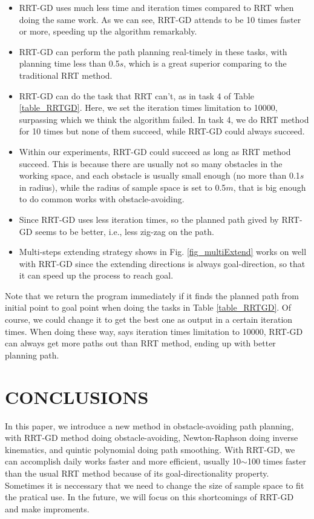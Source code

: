\documentclass[letterpaper, 10 pt, conference]{ieeeconf}  %
\begin{document}
\begin{itemize}

\item RRT-GD uses much less time and iteration times compared to RRT when doing the same work. As we can see, RRT-GD attends to be 10 times faster or more, speeding up the algorithm remarkably.
\item RRT-GD can perform the path planning real-timely in these tasks, with planning time less than 0.5$s$, which is a great superior comparing to the traditional RRT method.
\item RRT-GD can do the task that RRT can't, as in task 4 of Table \ref{table_RRTGD}. Here, we set the iteration times limitation to 10000,  surpassing which we think the algorithm failed. In task 4, we do RRT method for 10 times but none of them succeed, while RRT-GD could always succeed.
\item Within our experiments, RRT-GD could succeed as long as RRT method succeed. This is because there are usually not so many obstacles in the working space, and each obstacle is usually small enough (no more than 0.1$s$ in radius), while the radius of sample space is set to 0.5$m$, that is big enough to do common works with obstacle-avoiding.
\item Since RRT-GD uses less iteration times, so the planned path gived by RRT-GD seems to be better, i.e., less zig-zag on the path.
\item Multi-steps extending strategy shows in Fig. \ref{fig_multiExtend} works on well with RRT-GD since the extending directions is always goal-direction, so that it can speed up the process to reach goal.
\end{itemize}

Note that we return the program immediately if it finds the planned path from initial point to goal point when doing the tasks in Table \ref{table_RRTGD}. Of course, we could change it to get the best one as output in a certain iteration times. When doing these way, says iteration times limitation to 10000, RRT-GD can always get more paths out than RRT method, ending up with better planning path.

\section{CONCLUSIONS}

In this paper, we introduce a new method in obstacle-avoiding path planning, with RRT-GD method doing obstacle-avoiding, Newton-Raphson doing inverse kinematics, and quintic polynomial doing path smoothing. With RRT-GD, we can accomplish daily works faster and more efficient, usually 10$\sim$100 times faster than the usual RRT method because of its goal-directionality property. Sometimes it is neccessary that we need to change the size of sample space to fit the pratical use. In the future, we will focus on this shortcomings of RRT-GD and make improments.
\end{document}

